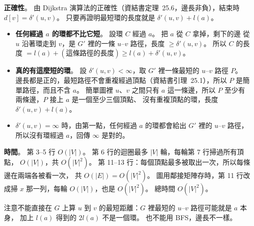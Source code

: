 \begin{pastsoln}
\textbf{正確性}。 由 Dijkstra 演算法的正確性（資結書定理~25.6，邊長非負），結束時 $d[v] =
\delta'(u, v)$。 只要再證明最短環的長度就是 $\delta'(u, v) + l(a)$。
\begin{itemize}
\item \textbf{任何經過 $a$ 的環都不比它短}。 設環 $C$ 經過 $a$。 把 $a$ 從 $C$ 拿掉，剩下的邊
從 $u$ 沿著環走到 $v$，是 $G'$ 裡的一條 $u$--$v$ 路徑，長度 $\ge \delta'(u, v)$。 所以
$C$ 的長度 $= l(a) + (\text{這條路徑的長度}) \ge l(a) + \delta'(u, v)$。
\item \textbf{真的有這麼短的環}。 設 $\delta'(u, v) < \infty$，取 $G'$ 裡一條最短的 $u$--$v$ 路徑 $P$。
邊長都是正的，最短路徑不會重複經過頂點（資結書引理~25.1），所以 $P$ 是簡單路徑，而且不含 $a$。
簡單圖裡 $u$、$v$ 之間只有 $a$ 這一條邊，所以 $P$ 至少有兩條邊，$P$ 接上 $a$ 是一個至少三個頂點、
沒有重複頂點的環，長度 $\delta'(u, v) + l(a)$。
\item $\delta'(u, v) = \infty$ 時，由第一點，任何經過 $a$ 的環都會給出 $G'$ 裡的 $u$--$v$ 路徑，
所以沒有環經過 $a$，回傳 $\infty$ 是對的。
\end{itemize}

\textbf{時間}。 第 3--5 行 $O(|V|)$。 第 6 行的迴圈最多 $|V|$ 輪，每輪第 7 行掃過所有頂點，
$O(|V|)$，共 $O(|V|^2)$。 第 11--13 行：每個頂點最多被取出一次，所以每條邊在兩端各被看一次，
共 $O(|E|) = O(|V|^2)$。 圖用鄰接矩陣存時，第 11 行改成掃 $x$ 那一列，每輪 $O(|V|)$，也是
$O(|V|^2)$。 總時間 $O(|V|^2)$。

注意不能直接在 $G$ 上算 $u$ 到 $v$ 的最短距離：$G$ 裡最短的 $u$--$v$ 路徑可能就是 $a$ 本身，
加上 $l(a)$ 得到的 $2l(a)$ 不是一個環。 也不能用 BFS，邊長不一樣。
\end{pastsoln}
